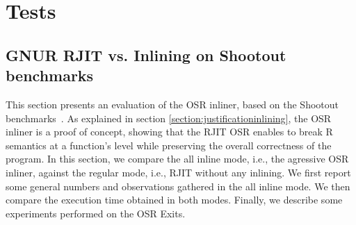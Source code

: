 \section{Tests}
\subsection{GNUR RJIT vs. Inlining on Shootout benchmarks}

     


This section presents an evaluation of the OSR inliner, based on the Shootout benchmarks~\cite{Shootout}.
As explained in section \ref{section:justificationinlining}, the OSR inliner is a proof of concept, showing that the RJIT OSR enables to break R semantics at a function's level while preserving the overall correctness of the program.
In this section, we compare the all inline mode, i.e., the agressive OSR inliner, against the regular mode, i.e., RJIT without any inlining.
We first report some general numbers and observations gathered in the all inline mode. 
We then compare the execution time obtained in both modes.
Finally, we describe some experiments performed on the OSR Exits.\\



